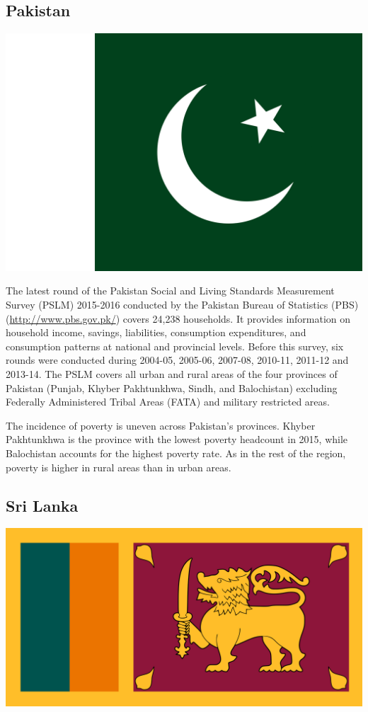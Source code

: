 \documentclass[13 pt,]{book}
\begin{document}
\subsection{Pakistan}\label{pakistan}

\begin{flushleft}\includegraphics[width=0.4\linewidth]{figures/Flag_of_Pakistan} \end{flushleft}

The latest round of the Pakistan Social and Living Standards Measurement
Survey (PSLM) 2015-2016 conducted by the Pakistan Bureau of Statistics
(PBS) (\url{http://www.pbs.gov.pk/}) covers 24,238 households. It
provides information on household income, savings, liabilities,
consumption expenditures, and consumption patterns at national and
provincial levels. Before this survey, six rounds were conducted during
2004-05, 2005-06, 2007-08, 2010-11, 2011-12 and 2013-14. The PSLM covers
all urban and rural areas of the four provinces of Pakistan (Punjab,
Khyber Pakhtunkhwa, Sindh, and Balochistan) excluding Federally
Administered Tribal Areas (FATA) and military restricted areas.

The incidence of poverty is uneven across Pakistan's provinces. Khyber
Pakhtunkhwa is the province with the lowest poverty headcount in 2015,
while Balochistan accounts for the highest poverty rate. As in the rest
of the region, poverty is higher in rural areas than in urban areas.

\subsection{Sri Lanka}\label{sri-lanka}

\begin{flushleft}\includegraphics[width=0.4\linewidth]{figures/Flag_of_Sri_Lanka} \end{flushleft}
\end{document}
